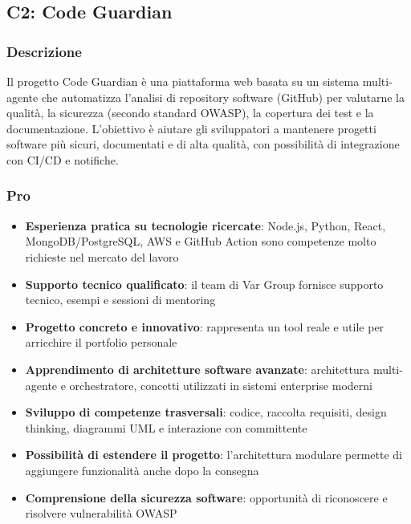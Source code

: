 \documentclass[11pt,a4paper]{article}
\begin{document}
\subsection{C2: Code Guardian}

\subsubsection{Descrizione}
Il progetto Code Guardian è una piattaforma web basata su un sistema multi-agente che automatizza l'analisi di repository software (GitHub) per valutarne la qualità, la sicurezza (secondo standard OWASP), la copertura dei test e la documentazione. L'obiettivo è aiutare gli sviluppatori a mantenere progetti software più sicuri, documentati e di alta qualità, con possibilità di integrazione con CI/CD e notifiche.

\subsubsection{Pro}
\begin{itemize}
    \item \textbf{Esperienza pratica su tecnologie ricercate}: Node.js, Python, React, MongoDB/PostgreSQL, AWS e GitHub Action sono competenze molto richieste nel mercato del lavoro
    \item \textbf{Supporto tecnico qualificato}: il team di Var Group fornisce supporto tecnico, esempi e sessioni di mentoring
    \item \textbf{Progetto concreto e innovativo}: rappresenta un tool reale e utile per arricchire il portfolio personale
    \item \textbf{Apprendimento di architetture software avanzate}: architettura multi-agente e orchestratore, concetti utilizzati in sistemi enterprise moderni
    \item \textbf{Sviluppo di competenze trasversali}: codice, raccolta requisiti, design thinking, diagrammi UML e interazione con committente
    \item \textbf{Possibilità di estendere il progetto}: l'architettura modulare permette di aggiungere funzionalità anche dopo la consegna
    \item \textbf{Comprensione della sicurezza software}: opportunità di riconoscere e risolvere vulnerabilità OWASP
\end{itemize}
\end{document}
